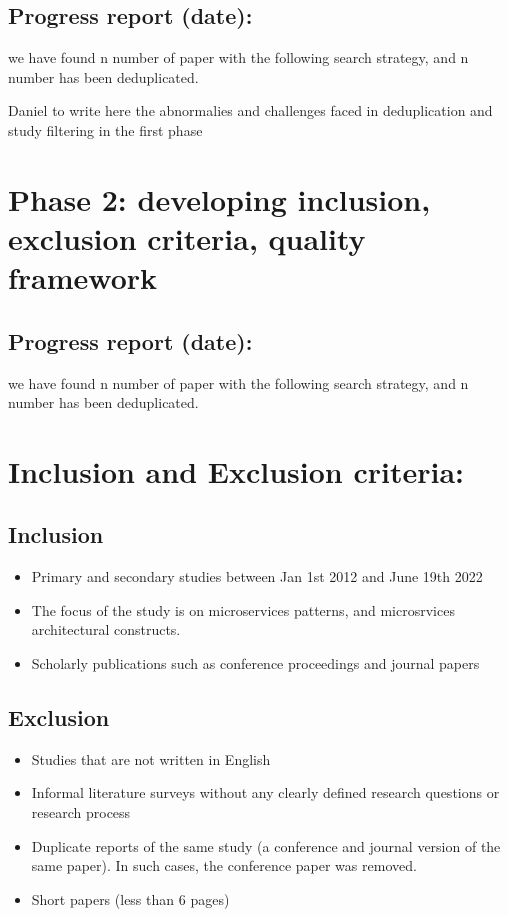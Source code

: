 \documentclass{article}
\theoremstyle{mytheoremstyle}
\theoremstyle{mytheoremstyle}
\theoremstyle{myproblemstyle}
\begin{document}
    \subsection{Progress report (date): }

     we have found n number of paper with the following search strategy, and n number has been deduplicated. 

     Daniel to write here the abnormalies and challenges faced in deduplication and study filtering in the first phase


     \section{Phase 2: developing inclusion, exclusion criteria, quality framework}

     \subsection{Progress report (date): }
 
      we have found n number of paper with the following search strategy, and n number has been deduplicated. 

      \section{Inclusion and Exclusion criteria:}

      \subsection{Inclusion}
      \begin{itemize}
        \item Primary and secondary studies between Jan 1st 2012 and June 19th 2022 
        \item The focus of the study is on microservices patterns, and microsrvices architectural constructs. 
        \item Scholarly publications such as conference proceedings and journal papers
      \end{itemize}

      \subsection{Exclusion}
      \begin{itemize}
        \item Studies that are not written in English
        \item Informal literature surveys without any clearly defined research questions or research process
        \item Duplicate reports of the same study (a conference and journal version of the same paper). In such cases, the conference paper was removed.
        \item Short papers (less than 6 pages)
      \end{itemize}
\end{document}

